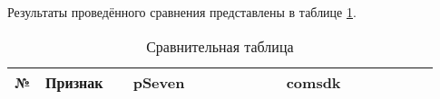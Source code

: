 Результаты проведённого сравнения представлены в таблице \ref{rndhpcblo.0209}.

\begin{landscape}
    \begin{longtable}{|p{0.03\linewidth}|p{0.2\linewidth}|p{0.35\linewidth}|p{0.35\linewidth}|}
        \caption{Сравнительная таблица}\label{rndhpcblo.0209}                                                                                                                                                                                                                                                                                                                                                                                                                                                                                                                                                                                                                                                                                                                                                                                                                                                                                                                                                                                                           \\
        \hline
        \textbf{№} & \textbf{Признак}                                                                           & \textbf{pSeven}                                                                                                                                                                                                                                                                                                                                                                                                                                                                                                                                                                                                                                                   & \textbf{comsdk}                                                                                                                                                                                                                                                                   \\
        \hline

\end{longtable}
\end{landscape}
